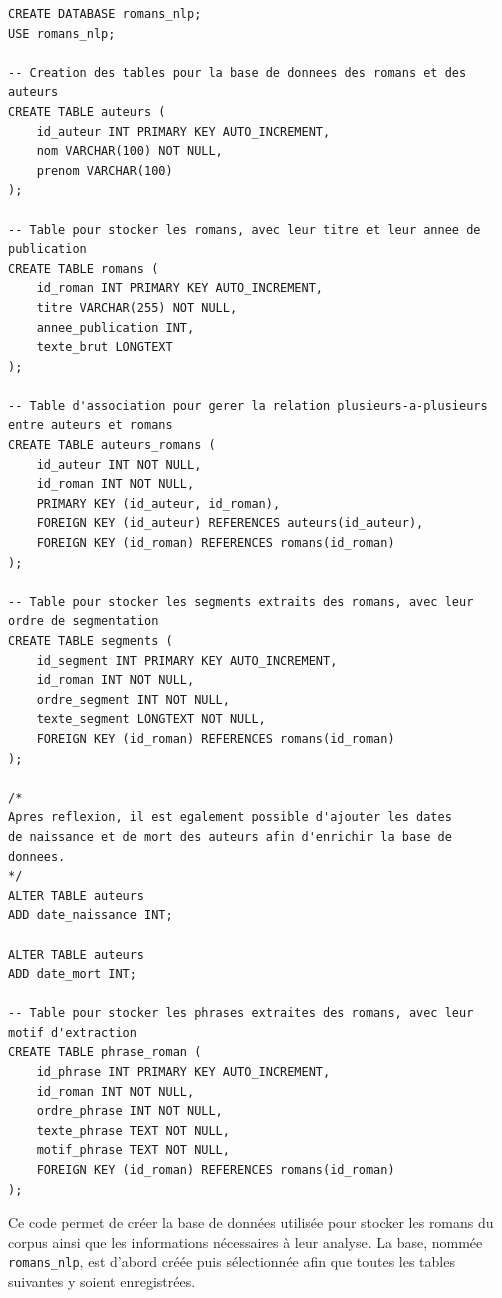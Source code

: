 \begin{listing}[htbp]
\begin{verbatim}
CREATE DATABASE romans_nlp;
USE romans_nlp;

-- Creation des tables pour la base de donnees des romans et des auteurs
CREATE TABLE auteurs (
    id_auteur INT PRIMARY KEY AUTO_INCREMENT,
    nom VARCHAR(100) NOT NULL,
    prenom VARCHAR(100)
);

-- Table pour stocker les romans, avec leur titre et leur annee de publication
CREATE TABLE romans (
    id_roman INT PRIMARY KEY AUTO_INCREMENT,
    titre VARCHAR(255) NOT NULL,
    annee_publication INT,
    texte_brut LONGTEXT
);

-- Table d'association pour gerer la relation plusieurs-a-plusieurs entre auteurs et romans
CREATE TABLE auteurs_romans (
    id_auteur INT NOT NULL,
    id_roman INT NOT NULL,
    PRIMARY KEY (id_auteur, id_roman),
    FOREIGN KEY (id_auteur) REFERENCES auteurs(id_auteur),
    FOREIGN KEY (id_roman) REFERENCES romans(id_roman)
);

-- Table pour stocker les segments extraits des romans, avec leur ordre de segmentation
CREATE TABLE segments (
    id_segment INT PRIMARY KEY AUTO_INCREMENT,
    id_roman INT NOT NULL,
    ordre_segment INT NOT NULL,
    texte_segment LONGTEXT NOT NULL,
    FOREIGN KEY (id_roman) REFERENCES romans(id_roman)
);

/*
Apres reflexion, il est egalement possible d'ajouter les dates
de naissance et de mort des auteurs afin d'enrichir la base de donnees.
*/
ALTER TABLE auteurs
ADD date_naissance INT;

ALTER TABLE auteurs
ADD date_mort INT;

-- Table pour stocker les phrases extraites des romans, avec leur motif d'extraction
CREATE TABLE phrase_roman (
    id_phrase INT PRIMARY KEY AUTO_INCREMENT,
    id_roman INT NOT NULL,
    ordre_phrase INT NOT NULL,
    texte_phrase TEXT NOT NULL,
    motif_phrase TEXT NOT NULL,
    FOREIGN KEY (id_roman) REFERENCES romans(id_roman)
);
\end{verbatim}
\caption{Création de la base de données romans\_nlp}
\end{listing}

Ce code permet de créer la base de données utilisée pour stocker les romans du corpus ainsi que les informations nécessaires à leur analyse. La base, nommée \texttt{romans\_nlp}, est d'abord créée puis sélectionnée afin que toutes les tables suivantes y soient enregistrées.


